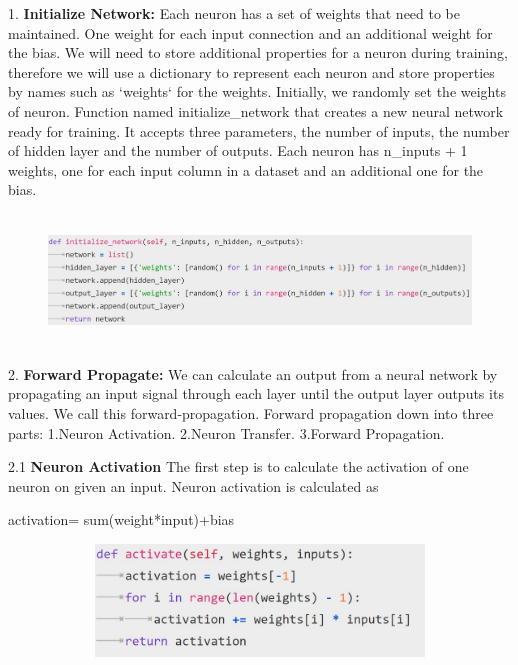 1. \textbf{Initialize Network:}
Each neuron has a set of weights that need to be maintained. One weight for each input connection and an additional weight for the bias. We will need to store additional properties for a neuron during training, therefore we will use a dictionary to represent each neuron and store properties by names such as ‘weights‘ for the weights.
Initially, we randomly set the weights of neuron.\newline
Function named initialize\_network that creates a new neural network ready for training. It accepts three parameters, the number of inputs, the number of  hidden layer and the number of outputs.\newline
Each neuron  has n\_inputs + 1 weights, one for each input column in a dataset and an additional one for the bias.

\begin{figure}[H]
\begin{center}
\includegraphics[width=160mm,height=35mm]{backexplain/initializeNetwork.jpg}
\end{center}
\end{figure}

2. \textbf{Forward Propagate:}
We can calculate an output from a neural network by propagating an input signal through each layer until the output layer outputs its values.
We call this forward-propagation.\newline
Forward propagation down into three parts:\newline
    1.Neuron Activation.\newline
    2.Neuron Transfer.\newline
    3.Forward Propagation.\newline
    
2.1 \textbf{Neuron Activation}
The first step is to calculate the activation of one neuron on given an input.\newline
Neuron activation is calculated as\newline
           \centerline{activation= sum(weight*input)+bias }

\begin{figure}[H]
\begin{center}
\includegraphics[width=120mm,height=30mm]{backexplain/activate.jpg}
\end{center}
     
\end{figure}            
            


